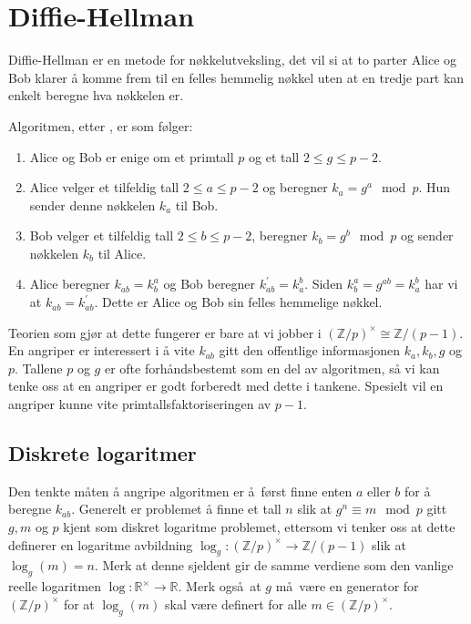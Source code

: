 \section{Diffie-Hellman}

Diffie-Hellman er en metode for nøkkelutveksling,
det vil si at to parter Alice og Bob klarer å komme
frem til en felles hemmelig nøkkel uten at en tredje part
kan enkelt beregne hva nøkkelen er.

Algoritmen, etter \cite{diffie_new_1976}, er som følger:
\begin{enumerate}
    \item Alice og Bob er enige om et primtall $p$
        og et tall $2 \leq g \leq p - 2$.
    \item Alice velger et tilfeldig tall $2 \leq a \leq p - 2$
        og beregner $k_a = g^a \mod p$.
        Hun sender denne nøkkelen $k_a$ til Bob.
    \item Bob velger et tilfeldig tall $2 \leq b \leq p - 2$,
        beregner $k_b = g^b\mod p$
        og sender nøkkelen $k_b$ til Alice.
    \item Alice beregner $k_{ab} = k_b^a$
        og Bob beregner $k_{ab}^\prime = k_a^b$.
        Siden $k_b^a = g^{ab} = k_a^b$ har vi
        at $k_{ab} = k_{ab}^\prime$.
        Dette er Alice og Bob sin felles hemmelige nøkkel.
\end{enumerate}

Teorien som gjør at dette fungerer er bare at vi jobber i
${(\mathbb Z / p)}^\times\cong\mathbb Z / (p - 1)$.
En angriper er interessert i å vite $k_{ab}$ gitt den offentlige informasjonen
$k_a, k_b, g$ og $p$.
Tallene $p$ og $g$ er ofte forhåndsbestemt som en del av algoritmen,
så vi kan tenke oss at en angriper er godt forberedt med dette i tankene.
Spesielt vil en angriper kunne vite primtallsfaktoriseringen av $p - 1$.

\subsection{Diskrete logaritmer}\label{sec:discrete-logarithms}

Den tenkte måten å angripe algoritmen er å først finne enten $a$ eller $b$
for å beregne $k_{ab}$.
Generelt er problemet å finne et tall $n$ slik at $g^n \equiv m\mod p$ gitt
$g, m$ og $p$ kjent som diskret logaritme problemet,
ettersom vi tenker oss at dette definerer en logaritme avbildning
$\log_g\colon{(\mathbb Z / p)}^\times\to \mathbb Z / (p - 1)$
slik at $\log_g(m) = n$.
Merk at denne sjeldent gir de samme verdiene som den vanlige reelle logaritmen
$\log\colon \mathbb R^\times\to \mathbb R$.
Merk også at $g$ må være en generator for ${(\mathbb Z / p)}^\times$
for at $\log_g(m)$ skal være definert for alle $m\in{(\mathbb Z / p)}^\times$.

